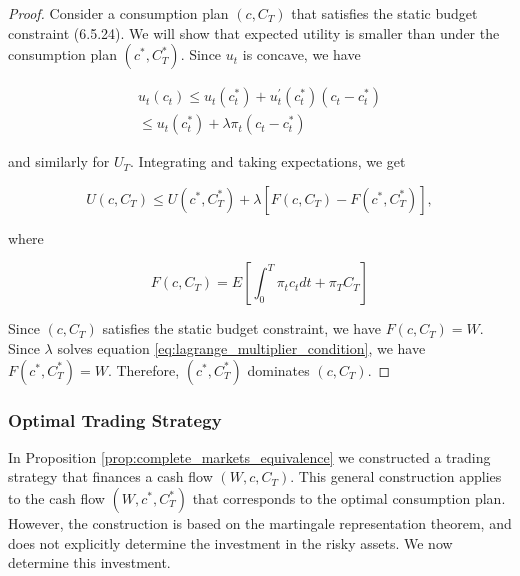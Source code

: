 \documentclass[\topdir/lecture\_notes.tex]{subfiles}
\begin{document}
\begin{proof}
Consider a consumption plan $\left(c, C_{T}\right)$ that satisfies the static budget constraint (6.5.24). We will show that expected utility is smaller than under the consumption plan $\left(c^{*}, C_{T}^{*}\right)$. Since $u_{t}$ is concave, we have

\begin{equation*}
\begin{gathered}
u_{t}\left(c_{t}\right) \leq u_{t}\left(c_{t}^{*}\right)+u_{t}^{\prime}\left(c_{t}^{*}\right)\left(c_{t}-c_{t}^{*}\right) \\
\leq u_{t}\left(c_{t}^{*}\right)+\lambda \pi_{t}\left(c_{t}-c_{t}^{*}\right)
\end{gathered}
\end{equation*}

and similarly for $U_{T}$. Integrating and taking expectations, we get

\begin{equation*}
U\left(c, C_{T}\right) \leq U\left(c^{*}, C_{T}^{*}\right)+\lambda\left[F\left(c, C_{T}\right)-F\left(c^{*}, C_{T}^{*}\right)\right],
\end{equation*}

where

\begin{equation*}
F\left(c, C_{T}\right)=E\left[\int_{0}^{T} \pi_{t} c_{t} d t+\pi_{T} C_{T}\right]
\end{equation*}

Since $\left(c, C_{T}\right)$ satisfies the static budget constraint, we have $F\left(c, C_{T}\right)=W$. Since $\lambda$ solves equation \eqref{eq:lagrange_multiplier_condition}, we have $F\left(c^{*}, C_{T}^{*}\right)=W$. Therefore, $\left(c^{*}, C_{T}^{*}\right)$ dominates $\left(c, C_{T}\right)$.
\end{proof}

\subsubsection{Optimal Trading Strategy}
In Proposition \ref{prop:complete_markets_equivalence} we constructed a trading strategy that finances a cash flow $\left(W, c, C_{T}\right)$. This general construction applies to the cash flow $\left(W, c^{*}, C_{T}^{*}\right)$ that corresponds to the optimal consumption plan. However, the construction is based on the martingale representation theorem, and does not explicitly determine the investment in the risky assets. We now determine this investment.
\end{document}

